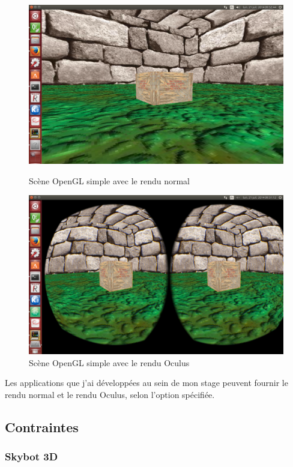 \documentclass[a4paper,french,12pt]{article}
\begin{document}
			    \begin{figure}
			      \centering
				\includegraphics[width=1.0\textwidth]{scene_normal4.png}
			      \caption{Scène OpenGL simple avec le rendu normal}

				\includegraphics[width=1.0\textwidth]{scene_oculus4.png}
			      \caption{Scène OpenGL simple avec le rendu Oculus}
			    \end{figure}
			    \clearpage
			    

			    Les applications que j'ai développées au sein de mon stage peuvent fournir le rendu normal 
			    et le rendu Oculus, selon l'option spécifiée.

		
	\subsection{Contraintes}
	
	\subsubsection{Skybot 3D}
\end{document}
